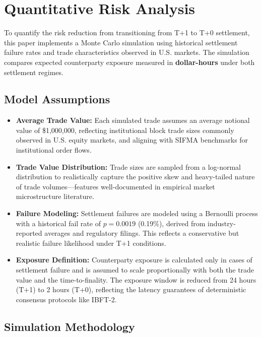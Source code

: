 \documentclass[conference]{IEEEtran}
\begin{document}
\section{Quantitative Risk Analysis}

To quantify the risk reduction from transitioning from T+1 to T+0 settlement, this paper implements a Monte Carlo simulation using historical settlement failure rates and trade characteristics observed in U.S. markets. The simulation compares expected counterparty exposure measured in \textbf{dollar-hours} under both settlement regimes.

\subsection{Model Assumptions}

\begin{itemize}
    \item \textbf{Average Trade Value:} Each simulated trade assumes an average notional value of \$1,000,000, reflecting institutional block trade sizes commonly observed in U.S. equity markets, and aligning with SIFMA benchmarks for institutional order flows.
    
    \item \textbf{Trade Value Distribution:} Trade sizes are sampled from a log-normal distribution to realistically capture the positive skew and heavy-tailed nature of trade volumes—features well-documented in empirical market microstructure literature.
    
    \item \textbf{Failure Modeling:} Settlement failures are modeled using a Bernoulli process with a historical fail rate of $p = 0.0019$ (0.19\%), derived from industry-reported averages and regulatory filings. This reflects a conservative but realistic failure likelihood under T+1 conditions.
    
    \item \textbf{Exposure Definition:} Counterparty exposure is calculated only in cases of settlement failure and is assumed to scale proportionally with both the trade value and the time-to-finality. The exposure window is reduced from 24 hours (T+1) to 2 hours (T+0), reflecting the latency guarantees of deterministic consensus protocols like IBFT-2.
\end{itemize}


\subsection{Simulation Methodology}
\end{document}
